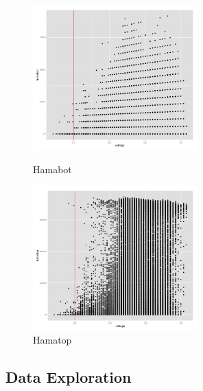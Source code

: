 \documentclass[english]{article}\usepackage[]{graphicx}\usepackage[]{color}
\begin{document}
\begin{figure}[H]
\centering
\begin{minipage}{.50\textwidth}
\centering
\includegraphics[width=180pt]{voltbot}
\vspace{-15pt}
\caption{Hamabot}
\vspace{-10pt}
\end{minipage}\hfill
\begin{minipage}{.50\textwidth}
\centering
\includegraphics[width=180pt]{volttop}
\vspace{-15pt}
\caption{Hamatop}
\vspace{-10pt}
\end{minipage}\hfill

\end{figure}

\subsection{Data Exploration}
\end{document}
